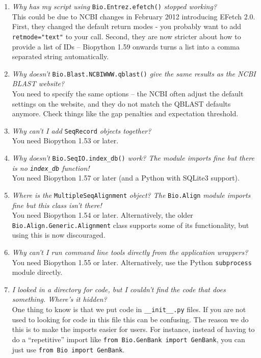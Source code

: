 \begin{enumerate}
  \item \emph{Why has my script using} \verb|Bio.Entrez.efetch()| \emph{stopped working?} \\
  This could be due to NCBI changes in February 2012 introducing EFetch 2.0.
  First, they changed the default return modes - you probably want to add \verb|retmode="text"| to
  your call.
  Second, they are now stricter about how to provide a list of IDs -- Biopython 1.59 onwards
  turns a list into a comma separated string automatically.

  \item \emph{Why doesn't} \verb|Bio.Blast.NCBIWWW.qblast()| \emph{give the same results as the NCBI BLAST website?} \\
  You need to specify the same options -- the NCBI often adjust the default settings on the website,
  and they do not match the QBLAST defaults anymore. Check things like the gap penalties and expectation threshold.

  \item \emph{Why can't I add} \verb|SeqRecord| \emph{objects together?} \\
  You need Biopython 1.53 or later.

  \item \emph{Why doesn't} \verb|Bio.SeqIO.index_db()| \emph{work? The module imports fine but there is no \texttt{index\_db} function!} \\
  You need Biopython 1.57 or later (and a Python with SQLite3 support).

  \item \emph{Where is the} \verb|MultipleSeqAlignment| \emph{object? The} \verb|Bio.Align| \emph{module imports fine but this class isn't there!} \\
  You need Biopython 1.54 or later. Alternatively, the older \verb|Bio.Align.Generic.Alignment| class supports some of its functionality, but using this is now discouraged.

  \item \emph{Why can't I run command line tools directly from the application wrappers?} \\
  You need Biopython 1.55 or later. Alternatively, use the Python \verb|subprocess| module directly.

  \item \emph{I looked in a directory for code, but I couldn't find the code that does something. Where's it hidden?} \\
  One thing to know is that we put code in \verb|__init__.py| files. If you are not used to looking for code in this file this can be confusing. The reason we do this is to make the imports easier for users. For instance, instead of having to do a ``repetitive'' import like \verb|from Bio.GenBank import GenBank|, you can just use \verb|from Bio import GenBank|.


\end{enumerate}
